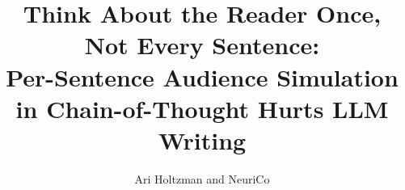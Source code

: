 \documentclass{article}
\title{Think About the Reader Once, Not Every Sentence:\\
Per-Sentence Audience Simulation in Chain-of-Thought Hurts LLM Writing}
\author{Ari Holtzman and NeuriCo}
\begin{document}
\maketitle

\begin{abstract}

\end{abstract}









\end{document}

